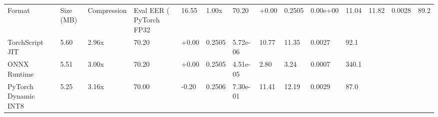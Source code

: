 \begin{tabular}{lllllllllll}
\toprule
Format & Size (MB) & Compression & Eval EER (%
\midrule
PyTorch FP32 & 16.55 & 1.00x & 70.20 & +0.00 & 0.2505 & 0.00e+00 & 11.04 & 11.82 & 0.0028 & 89.2 \\
TorchScript JIT & 5.60 & 2.96x & 70.20 & +0.00 & 0.2505 & 5.72e-06 & 10.77 & 11.35 & 0.0027 & 92.1 \\
ONNX Runtime & 5.51 & 3.00x & 70.20 & +0.00 & 0.2505 & 4.51e-05 & 2.80 & 3.24 & 0.0007 & 340.1 \\
PyTorch Dynamic INT8 & 5.25 & 3.16x & 70.00 & -0.20 & 0.2506 & 7.30e-01 & 11.41 & 12.19 & 0.0029 & 87.0 \\
\bottomrule
\end{tabular}
